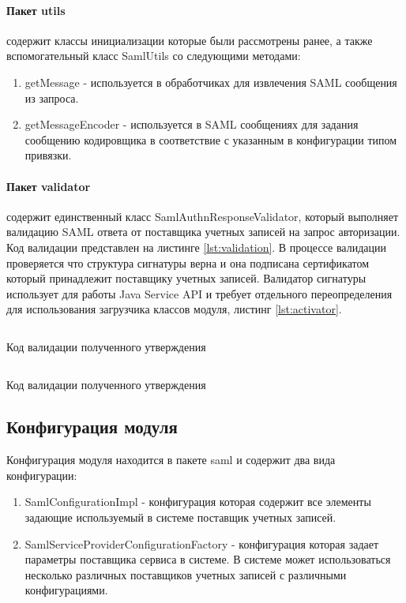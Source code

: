 \paragraph{Пакет utils} содержит классы инициализации которые были рассмотрены ранее, а также вспомогательный класс SamlUtils со следующими методами:
\begin{enumerate}
\item getMessage - используется в обработчиках для извлечения SAML сообщения из запроса.
\item getMessageEncoder - используется в SAML сообщениях для задания сообщению кодировщика в соответствие с указанным в конфигурации типом  привязки.
\end{enumerate}
\paragraph{Пакет validator} содержит единственный класс SamlAuthnResponseValidator, который выполняет валидацию SAML ответа от поставщика учетных записей на запрос авторизации. Код валидации представлен на листинге \ref{lst:validation}. В процессе валидации проверяется что структура сигнатуры верна и она подписана сертификатом который принадлежит поставщику учетных записей. Валидатор сигнатуры использует для работы Java Service API и требует отдельного переопределения для использования загрузчика классов модуля, листинг \ref{lst:activator}.

\begin{listing}[H]
\inputminted[linenos,frame=single]{java}{inc/src/validation}
\caption{Код валидации полученного утверждения} 
\label{lst:validation}
\end{listing}

\begin{listing}[H]
\inputminted[linenos,frame=single]{java}{inc/src/validatorLoader}
\caption{Код валидации полученного утверждения} 
\label{lst:validatorLoader}
\end{listing}

\subsection{Конфигурация модуля}
Конфигурация модуля находится в пакете saml и содержит два вида конфигурации:
\begin{enumerate}
\item SamlConfigurationImpl - конфигурация которая содержит все элементы задающие используемый в системе поставщик учетных записей.
\item SamlServiceProviderConfigurationFactory - конфигурация которая задает параметры поставщика сервиса в системе. В системе может использоваться несколько различных поставщиков учетных записей с различными конфигурациями.
\end{enumerate}

